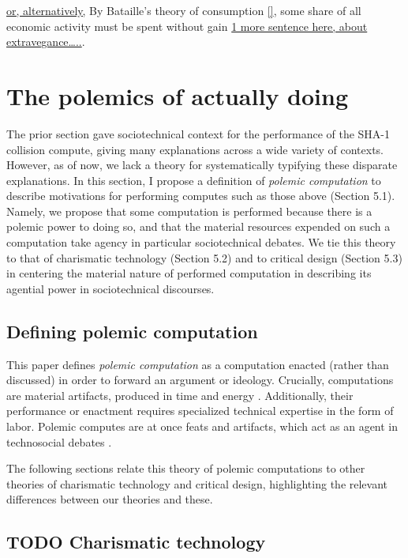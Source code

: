 \documentclass[sigconf]{acmart}
\begin{document}
\uline{or, alternatively,}
By Bataille's theory of consumption \uline{[]}, some share of all economic activity must be spent without gain 
\uline{1 more sentence here, about extravegance\ldots{}..}.


\section{The polemics of actually doing}
\label{sec:org91e13ba}

The prior section gave sociotechnical context for the performance of the SHA-1 collision compute,
giving many explanations across a wide variety of contexts.
However, as of now, we lack a theory for systematically typifying these disparate explanations.
In this section, I propose a definition of \emph{polemic computation} to describe motivations for performing computes such as those above (Section 5.1).
Namely, we propose that some computation is performed because there is a polemic power to doing so, 
and that the material resources expended on such a computation take agency in particular sociotechnical debates.
We tie this theory to that of charismatic technology (Section 5.2)
and to critical design (Section 5.3)
in centering the material nature of performed computation
in describing its agential power in sociotechnical discourses.

\subsection{Defining polemic computation}
\label{sec:org5a405b1}

This paper defines \emph{polemic computation} 
as a computation enacted (rather than discussed)
in order to forward an argument or ideology.
Crucially, computations are material artifacts, 
produced in time and energy 
\cite{Dourish2011a}.
Additionally,
their performance or enactment requires 
specialized technical expertise in the form of labor.
Polemic computes are at once feats and artifacts, which act
as an agent in technosocial debates \cite{Ames2015}.

The following sections relate this theory of polemic computations
to other theories of charismatic technology and critical design,
highlighting the relevant differences between our theories and these. 

\subsection{{\bfseries\sffamily TODO} Charismatic technology}
\label{sec:org1f21ac7}
\end{document}
